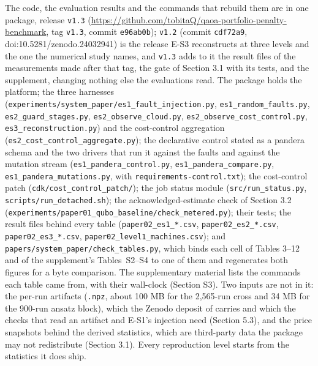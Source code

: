 \documentclass[acmsmall,screen,review]{acmart}
\begin{document}
The code, the evaluation results and the commands that rebuild them are in one package, release \texttt{v1.3} ({\url{https://github.com/tobitaQ/qaoa-portfolio-penalty-benchmark}}, tag \texttt{v1.3}, commit \texttt{e96ab0b}); \texttt{v1.2} (commit \texttt{cdf72a9}, doi:10.5281/zenodo.24032941) is the release E-S3 reconstructs at three levels and the one the numerical study names, and \texttt{v1.3} adds to it the result files of the measurements made after that tag, the gate of Section 3.1 with its tests, and the supplement, changing nothing else the evaluations read. The package holds the platform; the three harnesses (\texttt{experiments/\allowbreak{}system\_\allowbreak{}paper/\allowbreak{}es1\_\allowbreak{}fault\_\allowbreak{}injection.\allowbreak{}py}, \texttt{es1\_\allowbreak{}random\_\allowbreak{}faults.\allowbreak{}py}, \texttt{es2\_\allowbreak{}guard\_\allowbreak{}stages.\allowbreak{}py}, \texttt{es2\_\allowbreak{}observe\_\allowbreak{}cloud.\allowbreak{}py}, \texttt{es2\_\allowbreak{}observe\_\allowbreak{}cost\_\allowbreak{}control.\allowbreak{}py}, \texttt{es3\_\allowbreak{}reconstruction.\allowbreak{}py}) and the cost-control aggregation (\texttt{es2\_\allowbreak{}cost\_\allowbreak{}control\_\allowbreak{}aggregate.\allowbreak{}py}); the declarative control stated as a pandera schema and the two drivers that run it against the faults and against the mutation stream (\texttt{es1\_\allowbreak{}pandera\_\allowbreak{}control.\allowbreak{}py}, \texttt{es1\_\allowbreak{}pandera\_\allowbreak{}compare.\allowbreak{}py}, \texttt{es1\_\allowbreak{}pandera\_\allowbreak{}mutations.\allowbreak{}py}, with \texttt{requirements-\allowbreak{}control.\allowbreak{}txt}); the cost-control patch (\texttt{cdk/\allowbreak{}cost\_\allowbreak{}control\_\allowbreak{}patch/\allowbreak{}}); the job status module (\texttt{src/\allowbreak{}run\_\allowbreak{}status.\allowbreak{}py}, \texttt{scripts/\allowbreak{}run\_\allowbreak{}detached.\allowbreak{}sh}); the acknowledged-estimate check of Section 3.2 (\texttt{experiments/\allowbreak{}paper01\_\allowbreak{}qubo\_\allowbreak{}baseline/\allowbreak{}check\_\allowbreak{}metered.\allowbreak{}py}); their tests; the result files behind every table (\texttt{paper02\_\allowbreak{}es1\_\allowbreak{}*.\allowbreak{}csv}, \texttt{paper02\_\allowbreak{}es2\_\allowbreak{}*.\allowbreak{}csv}, \texttt{paper02\_\allowbreak{}es3\_\allowbreak{}*.\allowbreak{}csv}, \texttt{paper02\_\allowbreak{}level1\_\allowbreak{}machines.\allowbreak{}csv}); and \texttt{papers/\allowbreak{}system\_\allowbreak{}paper/\allowbreak{}check\_\allowbreak{}tables.\allowbreak{}py}, which binds each cell of Tables 3--12 and of the supplement's Tables~S2--S4 to one of them and regenerates both figures for a byte comparison. The supplementary material lists the commands each table came from, with their wall-clock (Section S3). Two inputs are not in it: the per-run artifacts (\texttt{.npz}, about 100 MB for the 2,565-run cross and 34 MB for the 900-run ansatz block), which the Zenodo deposit of \cite{ref1} carries and which the checks that read an artifact and E-S1's injection need (Section 5.3), and the price snapshots behind the derived statistics, which are third-party data the package may not redistribute (Section 3.1). Every reproduction level starts from the statistics it does ship.
\end{document}

